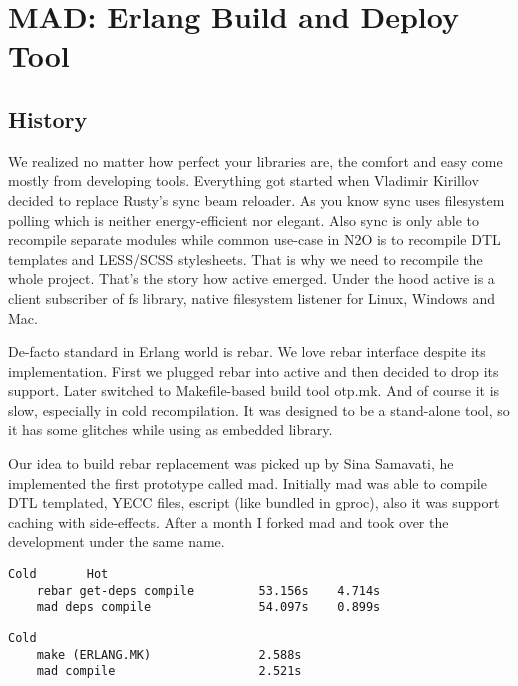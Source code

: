 \section{MAD: Erlang Build and Deploy Tool}

\subsection{History}

We realized no matter how perfect your libraries are,
the comfort and easy come mostly from developing tools.
Everything got started when Vladimir Kirillov decided to
replace Rusty's sync beam reloader. As you know sync uses
filesystem polling which is neither energy-efficient nor elegant. Also
sync is only able to recompile separate modules while
common use-case in N2O is to recompile DTL templates
and LESS/SCSS stylesheets. That is why we need to recompile
the whole project. That's the story how active emerged.
Under the hood active is a client subscriber
of fs library, native filesystem listener for Linux, Windows and Mac.

De-facto standard in Erlang world is rebar.
We love rebar interface despite its implementation.
First we plugged rebar into active and then decided to drop its support.
Later switched to Makefile-based build tool otp.mk.
And of course it is slow, especially in cold recompilation.
It was designed to be a stand-alone tool, so it has some
glitches while using as embedded library.

Our idea to build rebar replacement was picked up by Sina Samavati,
he implemented the first prototype called mad. Initially mad
was able to compile DTL templated, YECC files, escript (like
bundled in gproc), also it was support caching with side-effects.
After a month I forked mad and took over the development under the same name.

\vspace{1\baselineskip}
\begin{lstlisting}[caption=Example of building N2O sample]
                                   Cold       Hot
    rebar get-deps compile         53.156s    4.714s
    mad deps compile               54.097s    0.899s
\end{lstlisting}
\vspace{1\baselineskip}

\vspace{1\baselineskip}
\begin{lstlisting}[caption=Example of building Cowboy]
                                   Cold
    make (ERLANG.MK)               2.588s
    mad compile                    2.521s
\end{lstlisting}
\vspace{1\baselineskip}


